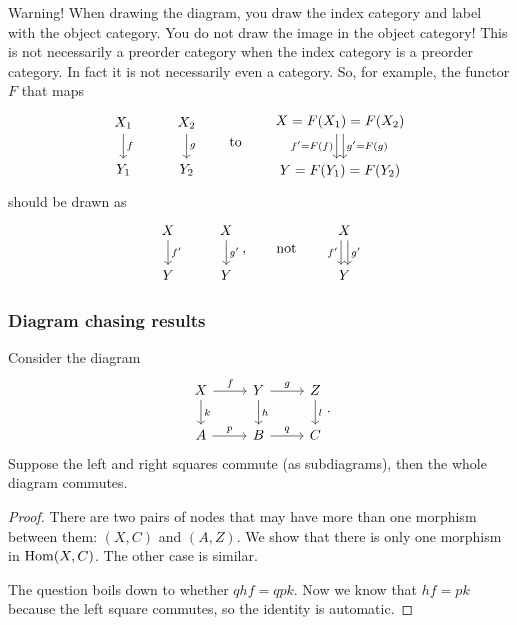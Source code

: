 \begin{example}
Warning! When drawing the diagram, you draw the index category and label with the object category. You do not draw the image in the object category! This is not necessarily a preorder category when the index category is a preorder category. In fact it is not necessarily even a category. So, for example, the functor $F$ that maps
\[ \begin{tikzcd}
X_1 \dar{f} & X_2 \dar{g} \\ Y_1 & Y_2
\end{tikzcd} \qquad\text{to}\qquad \begin{tikzcd}
X = F(X_1) = F(X_2) \ar[d, shift right, swap, "f' = F(f)"] \ar[d, shift left, "g' = F(g)"] \\ Y = F(Y_1) = F(Y_2)
\end{tikzcd}  \]
should be drawn as
\[ \begin{tikzcd}
X \dar{f'} & X \dar{g'} \\ Y & Y
\end{tikzcd}, \qquad\text{not}\qquad \begin{tikzcd}
X \ar[d, swap, shift right, "f'"] \ar[d, shift left, "g'"] \\ Y
\end{tikzcd} \]
\end{example}


\subsubsection{Diagram chasing results}
\begin{lemma} \label{commutingRectangle}
Consider the diagram
\[ \begin{tikzcd}
X \rar{f}\dar{k} & Y \rar{g}\dar{h} & Z\dar{l} \\
A \rar{p} & B \rar{q} & C
\end{tikzcd}. \]
Suppose the left and right squares commute (as subdiagrams), then the whole diagram commutes.
\end{lemma}
\begin{proof}
There are two pairs of nodes that may have more than one morphism between them: $(X,C)$ and $(A,Z)$. We show that there is only one morphism in $\operatorname{Hom}(X,C)$. The other case is similar.

The question boils down to whether $qhf = qpk$. Now we know that $hf = pk$ because the left square commutes, so the identity is automatic.
\end{proof}

